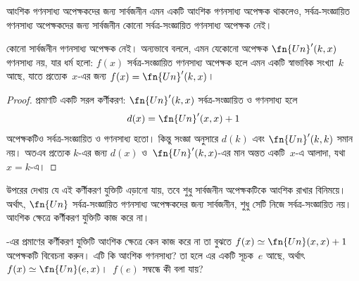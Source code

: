 \documentclass[../../../include/open-logic-section]{subfiles}
\begin{document}

আংশিক গণনসাধ্য অপেক্ষকদের জন্য সার্বজনীন এমন একটি আংশিক গণনসাধ্য
অপেক্ষক থাকলেও, সর্বত্র-সংজ্ঞায়িত গণনসাধ্য অপেক্ষকদের জন্য সার্বজনীন
কোনো সর্বত্র-সংজ্ঞায়িত গণনসাধ্য অপেক্ষক নেই।

\begin{thm}
কোনো সার্বজনীন গণনসাধ্য অপেক্ষক নেই। অন্যভাবে বললে, এমন যেকোনো অপেক্ষক
$\fn{Un}'(k, x)$ গণনসাধ্য নয়, যার ধর্ম হলো: $f(x)$ সর্বত্র-সংজ্ঞায়িত
গণনসাধ্য অপেক্ষক হলে এমন একটি স্বাভাবিক সংখ্যা~$k$ আছে, যাতে প্রত্যেক~$x$-এর
জন্য $f(x) = \fn{Un}'(k,x)$।
\end{thm}

\begin{proof}
প্রমাণটি একটি সরল কর্ণীকরণ: $\fn{Un}'(k,x)$ সর্বত্র-সংজ্ঞায়িত ও গণনসাধ্য
হলে
\[
d(x) = \fn{Un}'(x, x) + 1
\]
অপেক্ষকটিও সর্বত্র-সংজ্ঞায়িত ও গণনসাধ্য হতো। কিন্তু সংজ্ঞা অনুসারে
$d(k)$ এবং $\fn{Un}'(k,k)$ সমান নয়। অতএব প্রত্যেক $k$-এর জন্য $d(x)$
ও~$\fn{Un}'(k, x)$-এর মান অন্তত একটি~$x$-এ আলাদা, যথা $x = k$-এ।
\end{proof}

\begin{explain}
উপরের  দেখায় যে এই কর্ণীকরণ যুক্তিটি এড়ানো
যায়, তবে শুধু সার্বজনীন অপেক্ষকটিকে আংশিক রাখার বিনিময়ে। অর্থাৎ,
$\fn{Un}$ সর্বত্র-সংজ্ঞায়িত গণনসাধ্য অপেক্ষকদের জন্য সার্বজনীন, শুধু সেটি
নিজে সর্বত্র-সংজ্ঞায়িত নয়। আংশিক ক্ষেত্রে কর্ণীকরণ যুক্তিটি কাজ করে না।
\end{explain}

\begin{prob}
  -এর প্রমাণের কর্ণীকরণ যুক্তিটি আংশিক ক্ষেত্রে কেন
  কাজ করে না তা বুঝতে $f(x) \simeq \fn{Un}(x,x)+1$ অপেক্ষকটি বিবেচনা
  করুন। এটি কি আংশিক গণনসাধ্য? তা হলে এর একটি সূচক~$e$ আছে, অর্থাৎ
  $f(x) \simeq \fn{Un}(e,x)$।~$f(e)$ সম্বন্ধে কী বলা যায়?
\end{prob}
\end{document}
